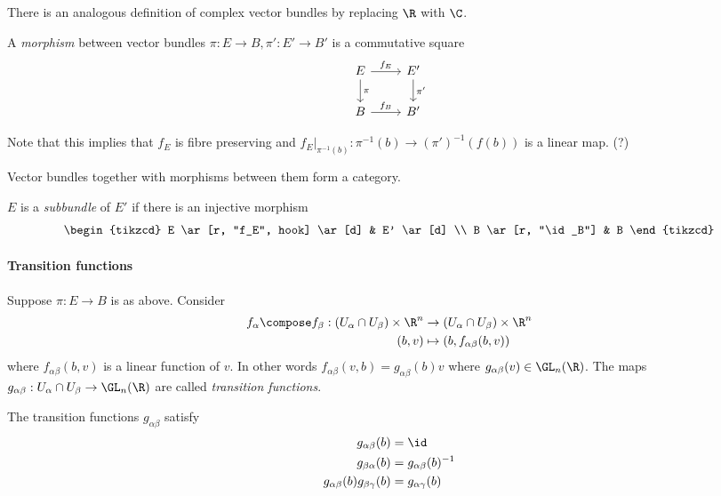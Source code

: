 \documentclass[a4paper]{article}
\begin{document}
There is an analogous definition of complex vector bundles by replacing \(\R\) with \(\C\).

\begin{definition}
  A \emph{morphism} between vector bundles \(\pi: E \to B, \pi': E' \to B'\) is a commutative square
  \[
    \begin{tikzcd}
      E \ar[r, "f_E"] \ar[d, "\pi"] & E' \ar[d, "\pi'"] \\
      B \ar[r, "f_B"] & B'
    \end{tikzcd}
  \]
\end{definition}
Note that this implies that \(f_E\) is fibre preserving and \(f_E|_{\pi^{-1}(b)}: \pi^{-1}(b) \to (\pi')^{-1}(f(b))\) is a linear map. (?)

Vector bundles together with morphisms between them form a category.

\begin{definition}[subbundle]
  \(E\) is a \emph{subbundle} of \(E'\) if there is an injective morphism
  \[
    \begin{tikzcd}
      E \ar[r, "f_E", hook] \ar[d] & E' \ar[d] \\
      B \ar[r, "\id_B"] & B
    \end{tikzcd}
  \]
\end{definition}

\paragraph{Transition functions}

Suppose \(\pi: E \to B\) is as above. Consider
\begin{align*}
  f_\alpha \compose f_\beta: (U_\alpha \cap U_\beta) \times \R^n &\to (U_\alpha \cap U_\beta) \times \R^n \\
  (b, v) &\mapsto (b, f_{\alpha\beta}(b, v))
\end{align*}
where \(f_{\alpha\beta}(b, v)\) is a linear function of \(v\). In other words \(f_{\alpha\beta}(v, b) = g_{\alpha\beta}(b) v\) where \(g_{\alpha\beta}(v) \in \GL_n(\R)\). The maps \(g_{\alpha\beta}: U_\alpha \cap U_\beta \to \GL_n(\R)\) are called \emph{transition functions}.

\begin{lemma}
  The transition functions \(g_{\alpha\beta}\) satisfy
  \begin{align*}
    g_{\alpha\beta}(b) &= \id \\
    g_{\beta\alpha}(b) &= g_{\alpha\beta}(b)^{-1} \\
    g_{\alpha\beta}(b) g_{\beta\gamma}(b) &= g_{\alpha\gamma}(b)
  \end{align*}
\end{lemma}
\end{document}
